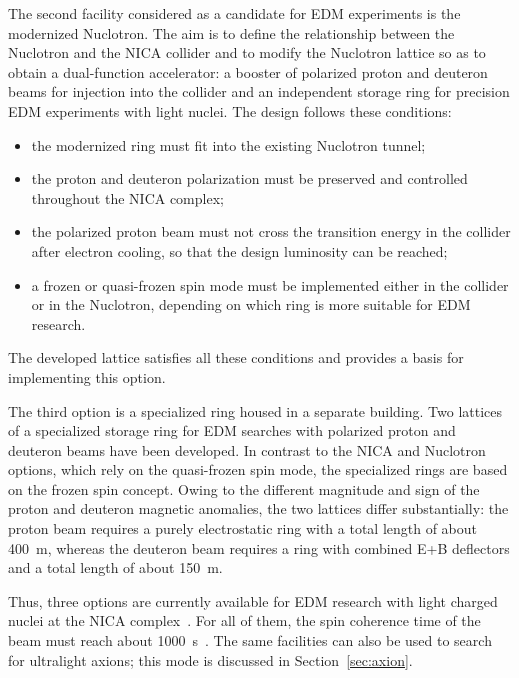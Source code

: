 The second facility considered as a candidate for EDM experiments is the
modernized Nuclotron. The aim is to define the relationship between the
Nuclotron and the NICA collider and to modify the Nuclotron lattice so as to
obtain a dual-function accelerator: a booster of polarized proton and deuteron
beams for injection into the collider and an independent storage ring for
precision EDM experiments with light nuclei. The design follows these
conditions:
\begin{itemize}
  \item the modernized ring must fit into the existing Nuclotron tunnel;
  \item the proton and deuteron polarization must be preserved and controlled
        throughout the NICA complex;
  \item the polarized proton beam must not cross the transition energy in the
        collider after electron cooling, so that the design luminosity can be
        reached;
  \item a frozen or quasi-frozen spin mode must be implemented either in the
        collider or in the Nuclotron, depending on which ring is more suitable
        for EDM research.
\end{itemize}
The developed lattice satisfies all these conditions and provides a basis
for implementing this option.

The third option is a specialized ring housed in a separate building. Two
lattices of a specialized storage ring for EDM searches with polarized proton
and deuteron beams have been developed. In contrast to the NICA and Nuclotron
options, which rely on the quasi-frozen spin mode, the specialized rings are
based on the frozen spin concept. Owing to the different magnitude and sign of
the proton and deuteron magnetic anomalies, the two lattices differ
substantially: the proton beam requires a purely electrostatic ring with a
total length of about \SI{400}{m}, whereas the deuteron beam requires a ring
with combined E+B deflectors and a total length of about \SI{150}{m}.

Thus, three options are currently available for EDM research with light
charged nuclei at the NICA complex~\cite{Senichev:2024fey,Senichev:2023vtx,Aksentev:2021fsy}. For all of them,
the spin coherence time of the beam must reach about
\SI{1000}{s}~\cite{JEDI:2016swi}. The same facilities can also be used to
search for ultralight axions; this mode is discussed in
Section~\ref{sec:axion}.

